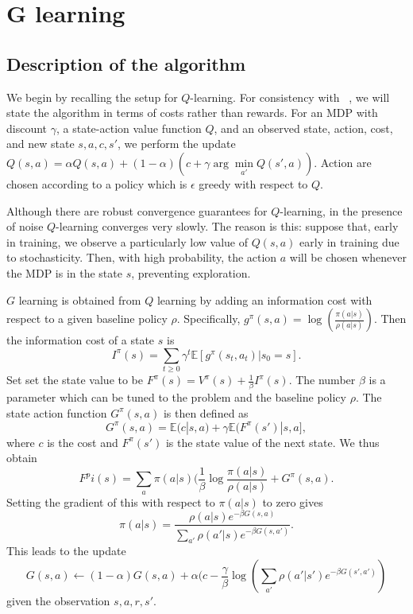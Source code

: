 \documentclass{article}
\begin{document}
\section{G learning}

\subsection{Description of the algorithm}

We begin by recalling the setup for $Q$-learning. For consistency with ~\cite{foxPakmanTishby}, we will state the algorithm in terms of costs rather than rewards. For an MDP with discount $\gamma$, a state-action value function $Q$, and an observed state, action, cost, and new state $s,a,c,s'$, we perform the update $Q(s,a)=\alpha Q(s,a) + (1-\alpha) (c + \gamma \arg \min\limits_{a'} Q(s',a))$. Action are chosen according to a policy which is $\epsilon$ greedy with respect to $Q$.

Although there are robust convergence guarantees for $Q$-learning, in the presence of noise $Q$-learning converges very slowly. The reason is this: suppose that, early in training, we observe a particularly low value of $Q(s,a)$ early in training due to stochasticity. Then, with high probability, the action $a$ will be chosen whenever the MDP is in the state $s$, preventing exploration.

$G$ learning is obtained from $Q$ learning by adding an information cost with respect to a given baseline policy $\rho$. Specifically, $g^\pi(s,a) = \log(\frac{\pi(a | s)}{\rho(a | s)})$. Then the information cost of a state $s$ is
\[
    I^\pi(s) = \sum\limits_{t \geq 0} \gamma^t \mathbb E [g^\pi(s_t,a_t) | s_0 = s].
\]
Set set the state value to be $F^\pi(s) = V^\pi(s) + \frac{1}{\beta} I^\pi(s)$. The number $\beta$ is a parameter which can be tuned to the problem and the baseline policy $\rho$. The state action function $G^\pi(s,a)$ is then defined as
\[
    G^\pi(s,a) = \mathbb E(c|s,a) + \gamma \mathbb E(F^\pi(s')|s,a],
\]
where $c$ is the cost and $F^\pi(s')$ is the state value of the next state. We thus obtain 
\[
    F^pi(s) = \sum\limits_{a} \pi(a|s) (\frac{1}{\beta} \log \frac{\pi(a|s)}{\rho(a|s)} + G^\pi(s,a).
\]
Setting the gradient of this with respect to $\pi(a|s)$ to zero gives
\[
    \pi(a|s) = \frac{\rho(a|s) e^{-\beta G(s,a)}}{\sum\limits_{a'} \rho(a'|s) e^{-\beta G(s,a')}}.
\]
This leads to the update
\[
    G(s,a) \leftarrow (1-\alpha) G(s,a) + \alpha(c - \frac{\gamma}{\beta} \log(\sum\limits_{a'} \rho(a'|s') e^{-\beta G(s',a')})
\]
given the observation $s,a,r,s'$.
\end{document}
